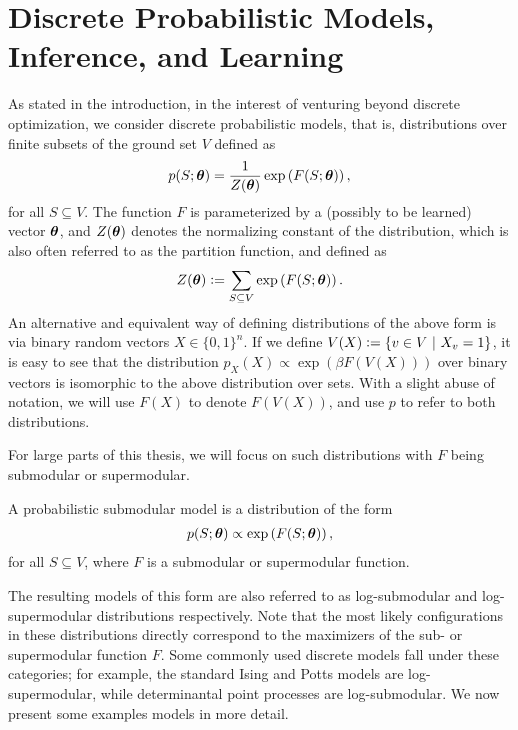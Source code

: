 \section{Discrete Probabilistic Models, Inference, and Learning}
As stated in the introduction, in the interest of venturing beyond discrete optimization, we consider discrete probabilistic models, that is, distributions over finite subsets of the ground set $V$ defined as
\begin{align*}
p(S; \bm{\theta}) = \frac{1}{Z(\bm{\theta})} \exp\left( F(S; \bm{\theta}) \right),
\end{align*}
for all $S \subseteq V$.
The function $F$ is parameterized by a (possibly to be learned) vector $\bm{\theta}$, and $Z(\bm{\theta})$ denotes the normalizing constant of the distribution, which is also often referred to as the partition function, and defined as
\begin{align*}
Z(\bm{\theta}) \vcentcolon= \sum_{S \subseteq V} \exp\left( F(S; \bm{\theta}) \right).
\end{align*}
An alternative and equivalent way of defining distributions of the above form is via binary random vectors $X \in \{0, 1\}^n$.
If we define $V(X) \vcentcolon= \left\{v \in V\ \middle\vert\  X_v = 1\right\}$, it is easy to see that the distribution $p_X(X) \propto \exp(\beta F(V(X)))$ over binary vectors is isomorphic to the above distribution over sets.
With a slight abuse of notation, we will use $F(X)$ to denote $F(V(X))$, and use $p$ to refer to both distributions.

For large parts of this thesis, we will focus on such distributions with $F$ being submodular or supermodular.
\begin{definition}
A probabilistic submodular model \citep{djolonga14,gotovos15} is a distribution of the form
\begin{align*}
p(S; \bm{\theta}) \propto \exp\left( F(S; \bm{\theta}) \right),
\end{align*}
for all $S \subseteq V$, where $F$ is a submodular or supermodular function.
\end{definition}
The resulting models of this form are also referred to as log-submodular and log-supermodular distributions respectively.
Note that the most likely configurations in these distributions directly correspond to the maximizers of the sub- or supermodular function $F$.
Some commonly used discrete models fall under these categories; for example, the standard Ising and Potts models are log-supermodular, while determinantal point processes are log-submodular.
We now present some examples models in more detail.

